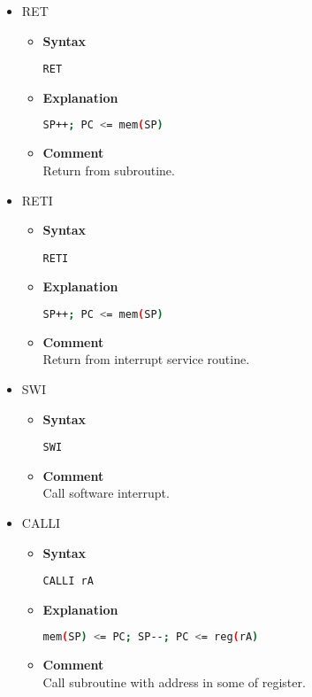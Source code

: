 \begin{itemize}

    \item RET
    \begin{itemize}
        \item \textbf{Syntax}
        \begin{lstlisting}[language={[markII]Assembler}, frame=single]
    RET
        \end{lstlisting}
        \item \textbf{Explanation}
        \begin{lstlisting}[language=bash, frame=single]
    SP++; PC <= mem(SP)
        \end{lstlisting}
        \item \textbf{Comment} \\
    Return from subroutine.
    \end{itemize}

    \item RETI
    \begin{itemize}
        \item \textbf{Syntax}
        \begin{lstlisting}[language={[markII]Assembler}, frame=single]
    RETI
        \end{lstlisting}
        \item \textbf{Explanation}
        \begin{lstlisting}[language=bash, frame=single]
    SP++; PC <= mem(SP)
        \end{lstlisting}
        \item \textbf{Comment} \\
    Return from interrupt service routine.
    \end{itemize}

    \item SWI
    \begin{itemize}
        \item \textbf{Syntax}
        \begin{lstlisting}[language={[markII]Assembler}, frame=single]
    SWI
        \end{lstlisting}
        \item \textbf{Comment} \\
    Call software interrupt.
    \end{itemize}

    \item CALLI
    \begin{itemize}
        \item \textbf{Syntax}
        \begin{lstlisting}[language={[markII]Assembler}, frame=single]
    CALLI rA
        \end{lstlisting}
        \item \textbf{Explanation}
        \begin{lstlisting}[language=bash, frame=single]
    mem(SP) <= PC; SP--; PC <= reg(rA)
        \end{lstlisting}
        \item \textbf{Comment} \\
    Call subroutine with address in some of register.
    \end{itemize}


\end{itemize}
